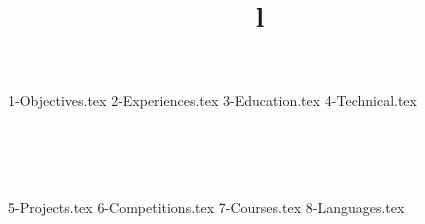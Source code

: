 \documentclass[margin]{res}
\begin{document}
\address{
\\\url{Github : https://www.github.com/louiszhenyean}
\\\url{Hackthebox : https://www.hackthebox.eu/profile/223593}
\\}
\address{
\\louiszhenyean@gmail.com
\\(+60) 19-567 5808 \\ \\}

\begin{resume}
{1-Objectives.tex}
{2-Experiences.tex}
{3-Education.tex}
{4-Technical.tex}
\begin{format}
\title{l}\\
\\
\body\\
\end{format}
{5-Projects.tex}
{6-Competitions.tex}
{7-Courses.tex}
{8-Languages.tex}
\end{resume}
\(\)
\end{document}
